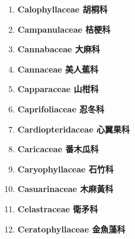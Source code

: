 \begin{enumerate}
        
      \item[] \begin{small}\textbf{Calophyllaceae 胡桐科} \end{small}
        
      \item[] \begin{small}\textbf{Campanulaceae 桔梗科} \end{small}
        
      \item[] \begin{small}\textbf{Cannabaceae 大麻科} \end{small}
        
      \item[] \begin{small}\textbf{Cannaceae 美人蕉科} \end{small}
        
      \item[] \begin{small}\textbf{Capparaceae 山柑科} \end{small}
        
      \item[] \begin{small}\textbf{Caprifoliaceae 忍冬科} \end{small}
        
      \item[] \begin{small}\textbf{Cardiopteridaceae 心翼果科} \end{small}
        
      \item[] \begin{small}\textbf{Caricaceae 番木瓜科} \end{small}
        
      \item[] \begin{small}\textbf{Caryophyllaceae 石竹科} \end{small}
        
      \item[] \begin{small}\textbf{Casuarinaceae 木麻黃科} \end{small}
        
      \item[] \begin{small}\textbf{Celastraceae 衛矛科} \end{small}
        
      \item[] \begin{small}\textbf{Ceratophyllaceae 金魚藻科} \end{small}

\end{enumerate}
